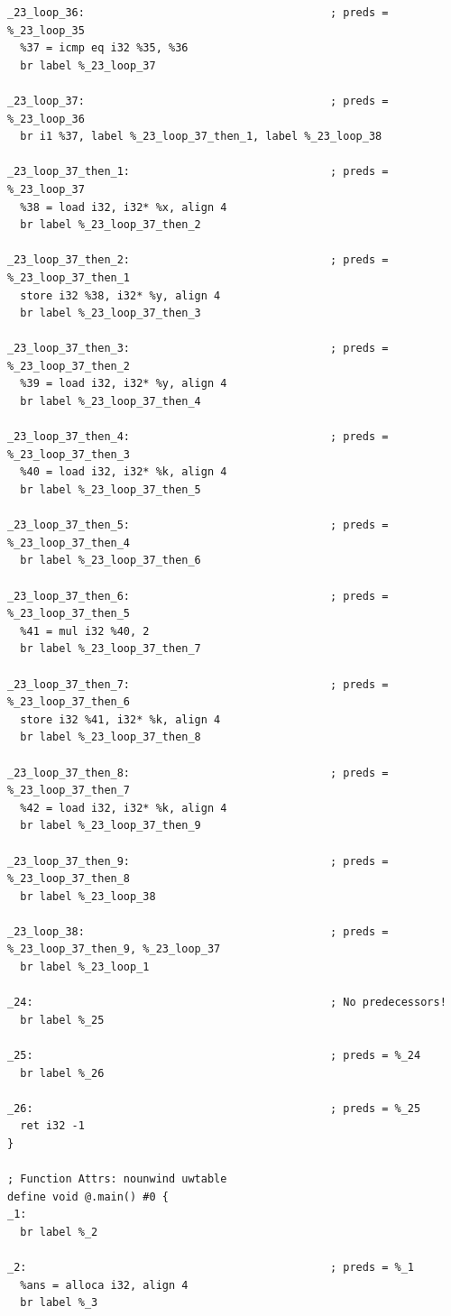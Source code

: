 \documentclass[12pt,a4paper]{article}
\begin{document}
\begin{verbatim}
_23_loop_36:                                      ; preds = %_23_loop_35
  %37 = icmp eq i32 %35, %36
  br label %_23_loop_37

_23_loop_37:                                      ; preds = %_23_loop_36
  br i1 %37, label %_23_loop_37_then_1, label %_23_loop_38

_23_loop_37_then_1:                               ; preds = %_23_loop_37
  %38 = load i32, i32* %x, align 4
  br label %_23_loop_37_then_2

_23_loop_37_then_2:                               ; preds = %_23_loop_37_then_1
  store i32 %38, i32* %y, align 4
  br label %_23_loop_37_then_3

_23_loop_37_then_3:                               ; preds = %_23_loop_37_then_2
  %39 = load i32, i32* %y, align 4
  br label %_23_loop_37_then_4

_23_loop_37_then_4:                               ; preds = %_23_loop_37_then_3
  %40 = load i32, i32* %k, align 4
  br label %_23_loop_37_then_5

_23_loop_37_then_5:                               ; preds = %_23_loop_37_then_4
  br label %_23_loop_37_then_6

_23_loop_37_then_6:                               ; preds = %_23_loop_37_then_5
  %41 = mul i32 %40, 2
  br label %_23_loop_37_then_7

_23_loop_37_then_7:                               ; preds = %_23_loop_37_then_6
  store i32 %41, i32* %k, align 4
  br label %_23_loop_37_then_8

_23_loop_37_then_8:                               ; preds = %_23_loop_37_then_7
  %42 = load i32, i32* %k, align 4
  br label %_23_loop_37_then_9

_23_loop_37_then_9:                               ; preds = %_23_loop_37_then_8
  br label %_23_loop_38

_23_loop_38:                                      ; preds = %_23_loop_37_then_9, %_23_loop_37
  br label %_23_loop_1

_24:                                              ; No predecessors!
  br label %_25

_25:                                              ; preds = %_24
  br label %_26

_26:                                              ; preds = %_25
  ret i32 -1
}

; Function Attrs: nounwind uwtable
define void @.main() #0 {
_1:
  br label %_2

_2:                                               ; preds = %_1
  %ans = alloca i32, align 4
  br label %_3


\end{verbatim}
\end{document}
